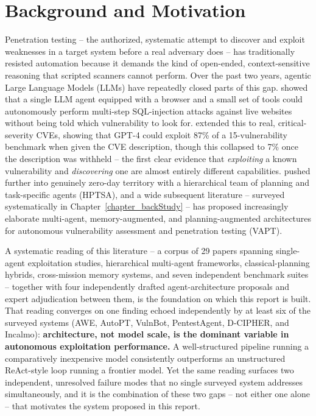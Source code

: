 \section{Background and Motivation}
\label{sec:intro_background}

Penetration testing -- the authorized, systematic attempt to discover and exploit weaknesses in a target system before a real adversary does -- has traditionally resisted automation because it demands the kind of open-ended, context-sensitive reasoning that scripted scanners cannot perform. Over the past two years, agentic Large Language Models (LLMs) have repeatedly closed parts of this gap. \citet{fang2024hackwebsites} showed that a single LLM agent equipped with a browser and a small set of tools could autonomously perform multi-step SQL-injection attacks against live websites without being told which vulnerability to look for. \citet{fang2024oneday} extended this to real, critical-severity CVEs, showing that GPT-4 could exploit 87\% of a 15-vulnerability benchmark when given the CVE description, though this collapsed to 7\% once the description was withheld -- the first clear evidence that \emph{exploiting} a known vulnerability and \emph{discovering} one are almost entirely different capabilities. \citet{zhu2024hptsa} pushed further into genuinely zero-day territory with a hierarchical team of planning and task-specific agents (HPTSA), and a wide subsequent literature -- surveyed systematically in Chapter~\ref{chapter_backStudy} -- has proposed increasingly elaborate multi-agent, memory-augmented, and planning-augmented architectures for autonomous vulnerability assessment and penetration testing (VAPT).

A systematic reading of this literature -- a corpus of 29 papers spanning single-agent exploitation studies, hierarchical multi-agent frameworks, classical-planning hybrids, cross-mission memory systems, and seven independent benchmark suites -- together with four independently drafted agent-architecture proposals and expert adjudication between them, is the foundation on which this report is built. That reading converges on one finding echoed independently by at least six of the surveyed systems (AWE, AutoPT, VulnBot, PentestAgent, D-CIPHER, and Incalmo): \textbf{architecture, not model scale, is the dominant variable in autonomous exploitation performance.} A well-structured pipeline running a comparatively inexpensive model consistently outperforms an unstructured ReAct-style loop running a frontier model. Yet the same reading surfaces two independent, unresolved failure modes that no single surveyed system addresses simultaneously, and it is the combination of these two gaps -- not either one alone -- that motivates the system proposed in this report.
